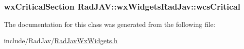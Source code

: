 \subsubsection[{\texorpdfstring{wcs\+Critical}{wcsCritical}}]{\setlength{\rightskip}{0pt plus 5cm}wx\+Critical\+Section Rad\+J\+A\+V\+::wx\+Widgets\+Rad\+Jav\+::wcs\+Critical}\hypertarget{class_rad_j_a_v_1_1wx_widgets_rad_jav_a93753443d9f01ad987a127cf496ba39e}{}\label{class_rad_j_a_v_1_1wx_widgets_rad_jav_a93753443d9f01ad987a127cf496ba39e}


The documentation for this class was generated from the following file\+:\begin{DoxyCompactItemize}
\item 
include/\+Rad\+Jav/\hyperlink{_rad_jav_wx_widgets_8h}{Rad\+Jav\+Wx\+Widgets.\+h}\end{DoxyCompactItemize}
